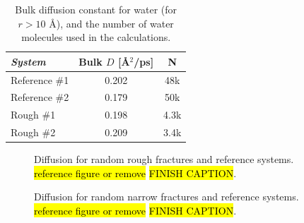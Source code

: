 

%
\begin{table}[!htb]%
    \centering%
    \begin{tabular}{l|cc}%
        \textit{System} & Bulk $D$ [\AA$^2$/ps] & N    \\\hline
        Reference \#1   & 0.202                 & 48k  \\ %
        Reference \#2   & 0.179                 & 50k  \\ %
        Rough \#1       & 0.198                 & 4.3k \\ %
        Rough \#2       & 0.209                 & 3.4k \\ %
    \end{tabular}%
    \vspace{8pt}%
    \caption{%
        Bulk diffusion constant for water (for $r>10$ \AA), and the number of water molecules used in the calculations. %
        \label{tab:bulk_water_diffusion}%
    }%
\end{table}

\begin{figure}[htpb]%
    \centering%
    \caption{%
        Diffusion for random rough fractures and reference systems. \hl{reference figure or remove} \hl{FINISH CAPTION}. %
    }%
\end{figure}%

\begin{figure}[htpb]%
    \centering%
    \caption{%
        Diffusion for random narrow fractures and reference systems. \hl{reference figure or remove} \hl{FINISH CAPTION}. %
    }%
\end{figure}%

